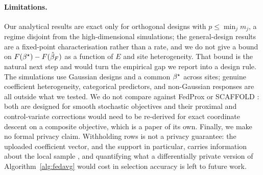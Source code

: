 \paragraph{Limitations.} Our analytical results are exact only for
orthogonal designs with $p \le \min_j m_j$, a regime disjoint from the
high-dimensional simulations; the general-design results are a fixed-point
characterisation rather than a rate, and we do not give a bound on
$F(\beta^\star) - F(\hat{\beta}_F)$ as a function of $E$ and site
heterogeneity. That bound is the natural next step and would turn the
empirical gap we report into a design rule. The simulations use Gaussian
designs and a common $\beta^\star$ across sites; genuine coefficient
heterogeneity, categorical predictors, and non-Gaussian responses are all
outside what we tested. We do not compare against FedProx
\citep{li2020fedprox} or SCAFFOLD \citep{karimireddy2020}: both are designed
for smooth stochastic objectives and their proximal and control-variate
corrections would need to be re-derived for exact coordinate descent on a
composite objective, which is a paper of its own. Finally, we make no
formal privacy claim. Withholding rows is not a privacy guarantee: the
uploaded coefficient vector, and the support in particular, carries
information about the local sample \citep{zhu2021}, and quantifying what a
differentially private version of Algorithm~\ref{alg:fedavg} would cost in
selection accuracy is left to future work.
